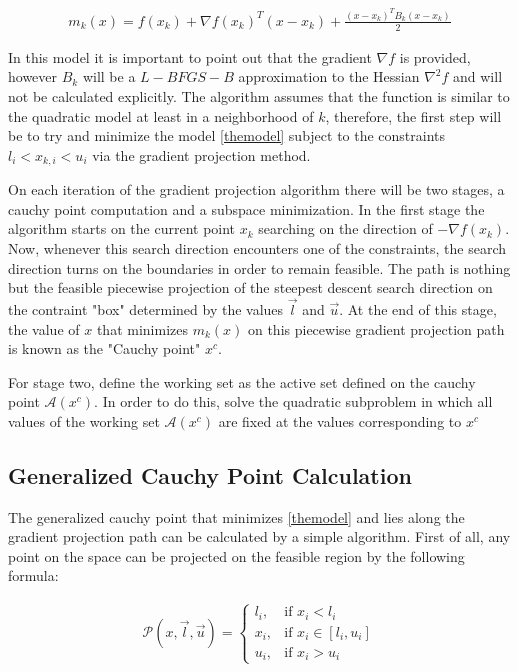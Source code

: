 \begin{equation} \label{themodel}
  \begin{aligned}
    m_k(x) = f(x_k) + \nabla f(x_k)^T ( x - x_k) + \frac{(x - x_k)^T B_k (x - x_k) }{2}
  \end{aligned}
\end{equation}

In this model it is important to point out that the gradient $\nabla f$ is provided, however $B_k$ will be a $L-BFGS-B$ approximation to the Hessian $\nabla^2 f$ and will not be calculated explicitly.  The algorithm assumes that the function is similar to the quadratic model at least in a neighborhood of $k$, therefore, the first step will be to try and minimize the model \ref{themodel} subject to the constraints $l_i < x_{k, i} < u_i$ via the gradient projection method.

On each iteration of the gradient projection algorithm there will be two stages, a cauchy point computation and a subspace minimization.  In the first stage the algorithm starts on the current point $x_k$ searching on the direction of $-\nabla f(x_k)$.  Now, whenever this search direction encounters one of the constraints, the search direction turns on the boundaries in order to remain feasible.  The path is nothing but the feasible piecewise projection of the steepest descent search direction on the contraint "box" determined by the values $\overrightarrow{l}$ and $\overrightarrow{u}$.  At the end of this stage, the value of $x$ that minimizes $m_k(x)$ on this piecewise gradient projection path is known as the "Cauchy point" $x^c$.

For stage two, define the working set as the active set defined on the cauchy point $\mathcal{A}(x^c)$.  In order to do this, solve the quadratic subproblem in which all values of the working set $\mathcal{A}(x^c)$ are fixed at the values corresponding to $x^c$

\subsection{Generalized Cauchy Point Calculation}

The generalized cauchy point that minimizes \ref{themodel} and lies along the gradient projection path can be calculated by a simple algorithm.  First of all, any point on the space can be projected on the feasible region by the following formula: 

\begin{equation}
  \begin{aligned}
    \mathcal{P}(x, \vec{l}, \vec{u}) = 
    \begin{cases}
      l_i, & \text{if } x_i < l_i \\
      x_i, & \text{if } x_i \in [l_i, u_i] \\
      u_i, & \text{if } x_i > u_i
    \end{cases}
  \end{aligned}
\end{equation}

